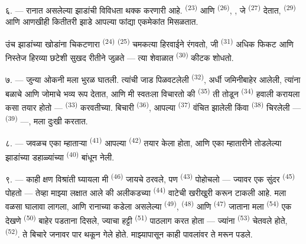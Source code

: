 ६. --- रानात असलेल्या झाडांची विविधता थक्क करणारी आहे. 
\textsuperscript{(23)} आणि  \textsuperscript{(26)}, , जे
 \textsuperscript{(27)} देतात,  \textsuperscript{(29)} आणि आणखीही
कितीतरी झाडे आपल्या फांद्या एकमेकांत मिसळतात.

उंच झाडांच्या खोडांना चिकटणारा  \textsuperscript{(24)} 
\textsuperscript{(25)} चमकत्या हिरवाईने रंगवतो, जी  \textsuperscript{(31)}
अधिक फिकट आणि निस्तेज हिरव्या छटेशी सुखद रीतीने जुळते — त्या शेवाळात 
\textsuperscript{(30)} कीटक शोधतो.

\VUsaut{3.0mm}
\VUsaut{3.0mm}

७. --- जुन्या ओकनी मला भुरळ घातली. त्यांची जाड पिळवटलेली  \textsuperscript{(32)},
अर्धी जमिनीबाहेर आलेली, त्यांना बळाचे आणि जोमाचे भव्य रूप देतात, आणि मी स्वतःला विचारतो की
 \textsuperscript{(35)} ती तोडून  \textsuperscript{(34)} हवाली
करायला कसा तयार होतो —  \textsuperscript{(33)} करवतीच्या. बिचारी
 \textsuperscript{(36)}, आपल्या  \textsuperscript{(37)} वंचित
झालेली किंवा  \textsuperscript{(38)} चिरलेली — 
\textsuperscript{(39)} —, मला दुःखी करतात.

८. --- जवळच एका म्हाताऱ्या  \textsuperscript{(41)} आपल्या
 \textsuperscript{(42)} तयार केला होता, आणि एका म्हातारीने
तोडलेल्या झाडांच्या डहाळ्यांच्या   \textsuperscript{(40)}
बांधून नेली.

\VUsaut{3.0mm}
\VUsaut{3.0mm}

९. --- काही क्षण विश्रांती घ्यायला मी  \textsuperscript{(46)} जायचे
ठरवले, पण  \textsuperscript{(43)} पोहोचलो — ज्यावर एक सुंदर 
\textsuperscript{(45)} पोहतो — तेव्हा माझ्या लक्षात आले की अलीकडच्या 
\textsuperscript{(44)} वाटेची खरीखुरी  करून टाकली आहे. मला वळसा घालावा लागला, आणि
रानाच्या कडेला असलेल्या  \textsuperscript{(49)}, 
\textsuperscript{(48)} आणि  \textsuperscript{(47)} जाताना मला
 \textsuperscript{(54)} एक देखणे  \textsuperscript{(50)}
बाहेर पडताना दिसले, ज्याचा हट्टी  \textsuperscript{(51)} पाठलाग
करत होता — ज्यांना  \textsuperscript{(53)} चेतवले होते,
 \textsuperscript{(52)}. ते बिचारे जनावर पार थकून गेले
होते. माझ्यापासून काही पावलांवर ते मरून पडले.

